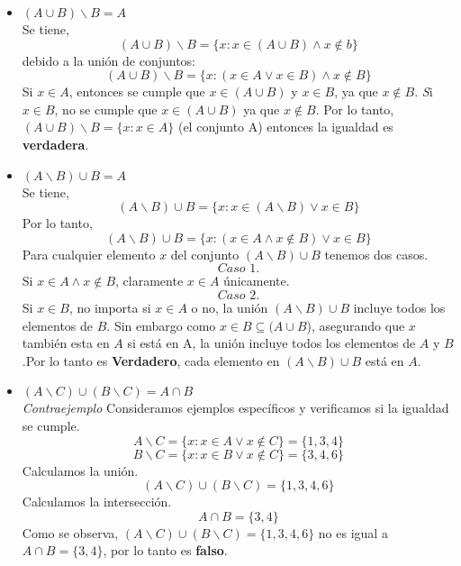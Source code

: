 \documentclass{article}
\theoremstyle{definition}
\begin{document}
\begin{enumerate}
\begin{itemize}
      \item $(A\cup B)\smallsetminus B = A$\\
      Se tiene,
      $$(A \cup B)\smallsetminus B=\{x: x\in (A\cup B) \wedge x\notin b\}$$
      debido a la unión de conjuntos:
      $$(A\cup B)\smallsetminus B =\{x: (x\in A \lor x\in B) \wedge x\notin B\}$$
      Si $x\in A$, entonces se cumple que $x\in (A\cup B)$ y $x\in B$, ya que $x\notin B$.
      \textit Si $x\in B$, no se cumple que $x\in (A\cup B)$ ya que $x\notin B$. Por lo tanto, $(A\cup B)\smallsetminus B=\{x: x\in A\}$ (el conjunto A) entonces la igualdad es \textbf{verdadera}. 

      \item $(A\smallsetminus B)\cup B = A$\\
      Se tiene, 
      $$(A \smallsetminus B) \cup B=\{x: x\in (A\smallsetminus B)\lor x\in B\} $$
      Por lo tanto,
      $$(A \smallsetminus B) \cup B=\{x: (x\in A \wedge x\notin B) \lor x\in B\}$$
      Para cualquier elemento $x$ del conjunto $(A \smallsetminus B)\cup B$ tenemos dos casos.
      $$\textit{Caso 1.}$$
      Si $x\in A \wedge x\notin B$, claramente $x\in A$ únicamente.
      $$\textit{Caso 2.}$$
      Si $x\in B$, no importa si $x\in A$ o no, la unión $(A \smallsetminus B)\cup B$ incluye todos los elementos de $B$. Sin embargo como $x\in B \subseteq (A \cup B$), asegurando que $x$ también esta en $A$ si está en A, la unión incluye todos los elementos de $A$ y $B$.Por lo tanto es \textbf{Verdadero}, cada elemento en $(A \smallsetminus B)\cup B$ está en $A$.\\

      \item $(A\smallsetminus C)\cup(B\smallsetminus C)=A\cap B$\\
      \textit{Contraejemplo}
      Consideramos ejemplos específicos y verificamos si la igualdad se cumple.
      $$A \smallsetminus C = \{x: x\in A \lor x\notin C\}=\{1,3,4\}$$
      $$B \smallsetminus C = \{x: x\in B \lor x\notin C\}=\{3,4,6\}$$
      Calculamos la unión.
      $$(A\smallsetminus C) \cup (B\smallsetminus C)=\{1,3,4,6\}$$
      Calculamos la intersección.
      $$A \cap B = \{3,4\}$$
      Como se observa, $(A \smallsetminus C)\cup (B \smallsetminus C)=\{1,3,4,6\}$ no es igual a $A \cap B = \{3,4\}$, por lo tanto es \textbf{falso}.


\end{itemize}
\end{enumerate}
\end{document}
